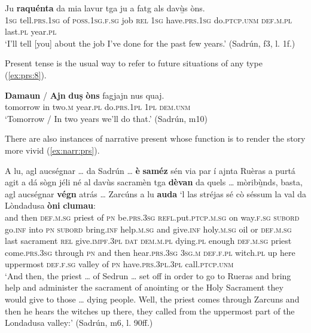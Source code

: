 \ea\label{ex:prs:7}
\gll   Ju \textbf{raquénta} da mia lavur tga ju a fatg als davù̱s òns. \\
\textsc{1sg} tell.\textsc{prs.1sg} of \textsc{poss.1sg.f.sg} job \textsc{rel} \textsc{1sg}  have.\textsc{prs.1sg} do.\textsc{ptcp.unm} \textsc{def.m.pl} last.\textsc{pl} year.\textsc{pl}\\
\glt `I’ll tell [you] about the job I've done for the past few years.' (Sadrún, f3, l. 1f.)
\z

Present tense is the usual way to refer to future situations of any type (\ref{ex:prs:8}).

\ea\label{ex:prs:8}
\gll   \textbf{Damaun} / \textbf{Ajn} \textbf{duṣ} \textbf{òns} fagjajn nus quaj. \\
tomorrow {} in two.\textsc{m} year.\textsc{pl} do.\textsc{prs.1pl} \textsc{1pl} \textsc{dem.unm}\\
\glt `Tomorrow / In two years we'll do that.' (Sadrún, m10)
\z

There are also instances of narrative present whose function is to render the story more vivid (\ref{ex:narr:prs}).

\ea\label{ex:narr:prs}
\gll    A lu, agl aucségnar … da Sadrún … \textbf{è} \textbf{saméz} sén via par í ajnta Ruèras a purtá agit a dá sògn jéli né al davùs sacramèn tga \textbf{dèvan} da quels … mòribù̱nds, basta, agl aucségnar \textbf{végn} atrás … Zarcúns a lu \textbf{auda} `l las stréjas sé cò séssum la val da Lòndadusa \textbf{òni} \textbf{clumau}:\\
and then \textsc{def.m.sg} priest {} of \textsc{pn} {} be.\textsc{prs.3sg}  \textsc{refl.}put.\textsc{ptcp.m.sg} on way.\textsc{f.sg} \textsc{subord} go.\textsc{inf} into \textsc{pn}  \textsc{subord} bring.\textsc{inf} help.\textsc{m.sg} and give.\textsc{inf} holy.\textsc{m.sg} oil or \textsc{def.m.sg} last sacrament \textsc{rel} give.\textsc{impf.3pl} \textsc{dat} \textsc{dem.m.pl} {} dying.\textsc{pl} enough \textsc{def.m.sg} priest come.\textsc{prs.3sg} through {} \textsc{pn} and then hear.\textsc{prs.3sg} \textsc{3sg.m} \textsc{def.f.pl} witch.\textsc{pl} up here uppermost \textsc{def.f.sg} valley of \textsc{pn} have.\textsc{prs.3pl.3pl} call.\textsc{ptcp.unm}\\
\glt `And then, the priest … of Sedrun … set off in order to go to Rueras and bring help and administer the sacrament of anointing or the Holy Sacrament they would give to those … dying people. Well, the priest comes through Zarcuns and then he hears the witches up there, they called from the uppermost part of the Londadusa valley:' (Sadrún, m6, l. 90ff.)
\z

